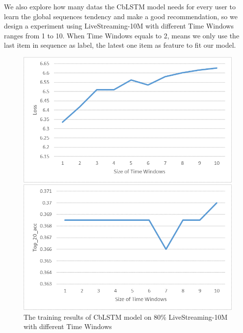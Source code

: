 \documentclass[runningheads]{llncs}
\begin{document}
We also explore how many datas the CbLSTM model needs for every user to learn the global sequences tendency and make a good recommendation, so we design a experiment using LiveStreaming-10M with different Time Windows ranges from 1 to 10. When Time Windows equals to 2, means we only use the last item in sequence as label, the latest one item as feature to fit our model. 
\begin{figure}[!htb]
   \begin{minipage}{0.48\textwidth}
     \centering
     \includegraphics[width=\linewidth]{Loss_timewindows.png}
   \end{minipage}\hfill
   \begin {minipage}{0.48\textwidth}
     \centering
     \includegraphics[width=\linewidth]{Top_20_acc_timewindows.png}
   \end{minipage}
   \caption{The training results of CbLSTM model on 80\% LiveStreaming-10M with different Time Windows}
\end{figure}
\end{document}
